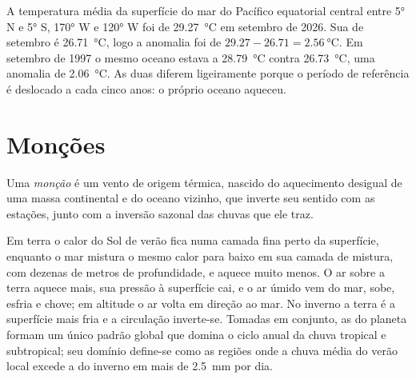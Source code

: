 \begin{example}\label{ex:b2:climate-variability:anomaly}
A temperatura média da superfície do mar do Pacífico equatorial central entre \ang{5} N e
\ang{5} S, \ang{170} W e \ang{120} W foi de \qty{29.27}{\celsius} em setembro de 2026. Sua 
de setembro é \qty{26.71}{\celsius}, logo a anomalia foi de $29.27 - 26.71 = \qty{2.56}{\celsius}$.
Em setembro de 1997 o mesmo oceano estava a \qty{28.79}{\celsius} contra \qty{26.73}{\celsius}, uma
anomalia de \qty{2.06}{\celsius}. As duas  diferem ligeiramente porque o período de
referência é deslocado a cada cinco anos: o próprio oceano aqueceu.
\end{example}

\section{Monções}\label{sec:b2:climate-variability:monsoons}

\begin{definition}[Monção]\label{def:b2:climate-variability:monsoon}
Uma \emph{monção} é um vento de origem térmica, nascido do aquecimento desigual de
uma massa continental e do oceano vizinho, que inverte seu sentido com as estações, junto com
a inversão sazonal das chuvas que ele traz.
\end{definition}

Em terra o calor do Sol de verão fica numa camada fina perto da superfície, enquanto o mar mistura
o mesmo calor para baixo em sua camada de mistura, com dezenas de metros de profundidade, e aquece muito menos. O ar sobre
a terra aquece mais, sua pressão à superfície cai, e o ar úmido vem do mar, sobe, esfria e
chove; em altitude o ar volta em direção ao mar. No inverno a terra é a superfície mais fria e a circulação
inverte-se. Tomadas em conjunto, as  do planeta formam um único padrão global que domina o ciclo
anual da chuva tropical e subtropical; seu domínio define-se como as regiões onde a chuva média
do verão local excede a do inverno em mais de \qty{2.5}{mm} por dia.

